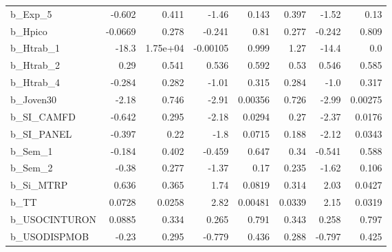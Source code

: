 \begin{tabular}{lrrrrrrr}
b\_Exp\_5       &  -0.602 &    0.411 &    -1.46 &    0.143 &         0.397 &        -1.52 &          0.13 \\
b\_Hpico       & -0.0669 &    0.278 &   -0.241 &     0.81 &         0.277 &       -0.242 &         0.809 \\
b\_Htrab\_1     &   -18.3 & 1.75e+04 & -0.00105 &    0.999 &          1.27 &        -14.4 &           0.0 \\
b\_Htrab\_2     &    0.29 &    0.541 &    0.536 &    0.592 &          0.53 &        0.546 &         0.585 \\
b\_Htrab\_4     &  -0.284 &    0.282 &    -1.01 &    0.315 &         0.284 &         -1.0 &         0.317 \\
b\_Joven30     &   -2.18 &    0.746 &    -2.91 &  0.00356 &         0.726 &        -2.99 &       0.00275 \\
b\_SI\_CAMFD    &  -0.642 &    0.295 &    -2.18 &   0.0294 &          0.27 &        -2.37 &        0.0176 \\
b\_SI\_PANEL    &  -0.397 &     0.22 &     -1.8 &   0.0715 &         0.188 &        -2.12 &        0.0343 \\
b\_Sem\_1       &  -0.184 &    0.402 &   -0.459 &    0.647 &          0.34 &       -0.541 &         0.588 \\
b\_Sem\_2       &   -0.38 &    0.277 &    -1.37 &     0.17 &         0.235 &        -1.62 &         0.106 \\
b\_Si\_MTRP     &   0.636 &    0.365 &     1.74 &   0.0819 &         0.314 &         2.03 &        0.0427 \\
b\_TT          &  0.0728 &   0.0258 &     2.82 &  0.00481 &        0.0339 &         2.15 &        0.0319 \\
b\_USOCINTURON &  0.0885 &    0.334 &    0.265 &    0.791 &         0.343 &        0.258 &         0.797 \\
b\_USODISPMOB  &   -0.23 &    0.295 &   -0.779 &    0.436 &         0.288 &       -0.797 &         0.425 \\
\bottomrule
\end{tabular}

